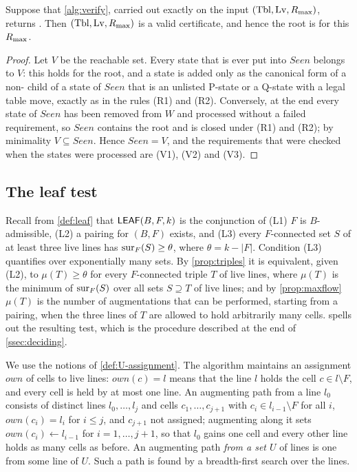 \begin{proposition}\label{prop:verify-correct}
Suppose that \cref{alg:verify}, carried out exactly on the input $(\mathrm{Tbl},\mathrm{Lv},R_{\max})$, returns \accept.
Then $(\mathrm{Tbl},\mathrm{Lv},R_{\max})$ is a valid certificate, and hence the root is \WON{} for this $R_{\max}$.
\end{proposition}

\begin{proof}
Let $V$ be the reachable set. Every state that is ever put into $\mathit{Seen}$ belongs to $V$: this holds
for the root, and a state is added only as the canonical form of a non-\VOID{} child of a state of
$\mathit{Seen}$ that is an unlisted P-state or a Q-state with a legal table move, exactly as in the rules
(R1) and (R2). Conversely, at the end every state of $\mathit{Seen}$ has been removed from $W$ and
processed without a failed requirement, so $\mathit{Seen}$ contains the root and is closed under (R1) and
(R2); by minimality $V\subseteq\mathit{Seen}$. Hence $\mathit{Seen}=V$, and the requirements that were
checked when the states were processed are (V1), (V2) and (V3).
\end{proof}

\subsection{The leaf test}\label{ssec:algleaf}

Recall from \cref{def:leaf} that $\mathsf{LEAF}(B,F,k)$ is the conjunction of (L1) $F$ is $B$-admissible, (L2)
a pairing for $(B,F)$ exists, and (L3) every $F$-connected set $S$ of at least three live lines has
$\operatorname{sur}_F(S)\ge\theta$, where $\theta=k-|F|$. Condition (L3) quantifies over exponentially many sets. By
\cref{prop:triples} it is equivalent, given (L2), to $\mu(T)\ge\theta$ for every $F$-connected triple $T$
of live lines, where $\mu(T)$ is the minimum of $\operatorname{sur}_F(S)$ over all sets $S\supseteq T$ of live lines; and
by \cref{prop:maxflow} $\mu(T)$ is the number of augmentations that can be performed, starting from a
pairing, when the three lines of $T$ are allowed to hold arbitrarily many cells.  spells
out the resulting test, which is the procedure described at the end of \cref{ssec:deciding}.

We use the notions of \cref{def:U-assignment}. The algorithm maintains an assignment $\mathit{own}$ of cells
to live lines: $\mathit{own}(c)=l$ means that the line $l$ holds the cell $c\in l\setminus F$, and every
cell is held by at most one line. An augmenting path from a line $l_0$ consists of distinct lines
$l_0,\dots,l_j$ and cells $c_1,\dots,c_{j+1}$ with $c_i\in l_{i-1}\setminus F$ for all $i$,
$\mathit{own}(c_i)=l_i$ for $i\le j$, and $c_{j+1}$ not assigned; augmenting along it sets
$\mathit{own}(c_i)\gets l_{i-1}$ for $i=1,\dots,j+1$, so that $l_0$ gains one cell and every other line holds
as many cells as before. An augmenting path \emph{from a set $U$} of lines is one from some line of $U$.
Such a path is found by a breadth-first search over the lines.

